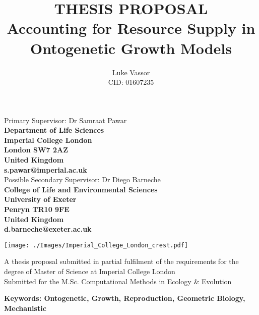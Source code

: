 \documentclass[11pt]{article}
\title{\LARGE{THESIS PROPOSAL} \\ \textbf{Accounting for Resource Supply in Ontogenetic Growth Models}}
\author{Luke Vassor \\ CID: 01607235}
\date{}
\begin{document}
    \maketitle    
    \begin{center}
        \begin{multicols}{2}
        \begin{singlespacing}
            Primary Supervisor: Dr Samraat Pawar \\
            \textbf{Department of Life Sciences \\
            Imperial College London \\
            London SW7 2AZ \\
            United Kingdom \\
            s.pawar@imperial.ac.uk \\}
            Possible Secondary Supervisor: Dr Diego Barneche \\
            \textbf{College of Life and Environmental Sciences \\
            University of Exeter \\
            Penryn TR10 9FE \\ 
            United Kingdom \\
            d.barneche@exeter.ac.uk \\}
        \end{singlespacing}
        \end{multicols}
        \vspace{3mm}
        \texttt{[image: ./Images/Imperial\_College\_London\_crest.pdf]} \\
        \vspace{3mm}
        
        A thesis proposal submitted in partial fulfilment of the requirements for the degree of Master of Science at Imperial College London \\
        Submitted for the M.Sc. Computational Methods in Ecology \& Evolution
    \end{center}
    \newpage
    \textbf{Keywords: Ontogenetic, Growth, Reproduction, Geometric Biology, Mechanistic}
\end{document}

